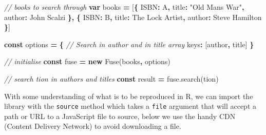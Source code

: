 \documentclass[
  10pt,
]{krantz}
\makeatletter
\newenvironment{Shaded}{\begin{snugshade}}{\end{snugshade}}
\newcommand{\AttributeTok}[1]{\textcolor[rgb]{0.61,0.61,0.61}{#1}}
\newcommand{\CommentTok}[1]{\textcolor[rgb]{0.37,0.37,0.37}{\textit{#1}}}
\newcommand{\DataTypeTok}[1]{\textcolor[rgb]{0.27,0.27,0.27}{#1}}
\newcommand{\KeywordTok}[1]{\textcolor[rgb]{0.27,0.27,0.27}{\textbf{#1}}}
\newcommand{\NormalTok}[1]{#1}
\newcommand{\OperatorTok}[1]{\textcolor[rgb]{0.43,0.43,0.43}{\textbf{#1}}}
\newcommand{\StringTok}[1]{\textcolor[rgb]{0.5,0.5,0.5}{#1}}
\newcommand{\VariableTok}[1]{\textcolor[rgb]{0,0,0}{#1}}
\newenvironment{kframe}{%
\medskip{}
\setlength{\fboxsep}{.8em}
 \def\at@end@of@kframe{}%
 \ifinner\ifhmode%
  \def\at@end@of@kframe{\end{minipage}}%
  \begin{minipage}{\columnwidth}%
 \fi\fi%
 \def\FrameCommand##1{\hskip\@totalleftmargin \hskip-\fboxsep
 \colorbox{shadecolor}{##1}\hskip-\fboxsep
     \hskip-\linewidth \hskip-\@totalleftmargin \hskip\columnwidth}%
 \MakeFramed {\advance\hsize-\width
   \@totalleftmargin\z@ \linewidth\hsize
   \@setminipage}}%
 {\par\unskip\endMakeFramed%
 \at@end@of@kframe}
\renewenvironment{Shaded}{\begin{kframe}}{\end{kframe}}
\makeatother
\begin{document}
\begin{Shaded}
\begin{Highlighting}[]
\CommentTok{// books to search through}
\KeywordTok{var}\NormalTok{ books }\OperatorTok{=}\NormalTok{ [}\OperatorTok{\{}
  \StringTok{\textquotesingle{}ISBN\textquotesingle{}}\OperatorTok{:} \StringTok{\textquotesingle{}A\textquotesingle{}}\OperatorTok{,}
  \StringTok{\textquotesingle{}title\textquotesingle{}}\OperatorTok{:} \StringTok{"Old Man\textquotesingle{}s War"}\OperatorTok{,}
  \StringTok{\textquotesingle{}author\textquotesingle{}}\OperatorTok{:} \StringTok{\textquotesingle{}John Scalzi\textquotesingle{}}
\OperatorTok{\},} \OperatorTok{\{}
  \StringTok{\textquotesingle{}ISBN\textquotesingle{}}\OperatorTok{:} \StringTok{\textquotesingle{}B\textquotesingle{}}\OperatorTok{,}
  \StringTok{\textquotesingle{}title\textquotesingle{}}\OperatorTok{:} \StringTok{\textquotesingle{}The Lock Artist\textquotesingle{}}\OperatorTok{,}
  \StringTok{\textquotesingle{}author\textquotesingle{}}\OperatorTok{:} \StringTok{\textquotesingle{}Steve Hamilton\textquotesingle{}}
\OperatorTok{\}}\NormalTok{]}

\KeywordTok{const}\NormalTok{ options }\OperatorTok{=} \OperatorTok{\{}
  \CommentTok{// Search in \textasciigrave{}author\textasciigrave{} and in \textasciigrave{}title\textasciigrave{} array}
  \DataTypeTok{keys}\OperatorTok{:}\NormalTok{ [}\StringTok{\textquotesingle{}author\textquotesingle{}}\OperatorTok{,} \StringTok{\textquotesingle{}title\textquotesingle{}}\NormalTok{]}
\OperatorTok{\}}

\CommentTok{// initialise}
\KeywordTok{const}\NormalTok{ fuse }\OperatorTok{=} \KeywordTok{new} \AttributeTok{Fuse}\NormalTok{(books}\OperatorTok{,}\NormalTok{ options)}

\CommentTok{// search \textquotesingle{}tion\textquotesingle{} in authors and titles}
\KeywordTok{const}\NormalTok{ result }\OperatorTok{=} \VariableTok{fuse}\NormalTok{.}\AttributeTok{search}\NormalTok{(}\StringTok{\textquotesingle{}tion\textquotesingle{}}\NormalTok{)}
\end{Highlighting}
\end{Shaded}

With some understanding of what is to be reproduced in R, we can import the library with the \texttt{source} method which takes a \texttt{file} argument that will accept a path or URL to a JavaScript file to source, below we use the handy CDN (Content Delivery Network) to avoid downloading a file.

\begin{Shaded}
\end{Shaded}
\end{document}
